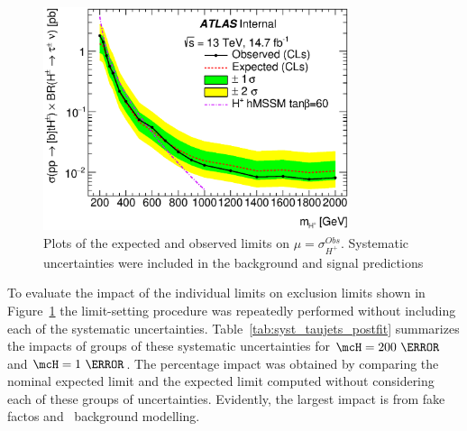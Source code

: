\begin{figure}[!h]
\centering
					 \includegraphics[width=0.8\textwidth]{figures/final_limits_sys_asym_limit_log.eps}
\caption{Plots of the expected and observed limits on $\mu=\sigma^{Obs}_{H^+}$. Systematic uncertainties were included  
in the background and signal predictions}
\label{fig:exclLimB}
\end{figure}

\par To evaluate the impact of the individual limits on exclusion limits shown in Figure~\ref{fig:exclLimB} 
the limit-setting procedure was repeatedly performed without including each of the systematic 
uncertainties. Table~\ref{tab:syst_taujets_postfit} summarizes the impacts of groups of these 
systematic uncertainties for $\mcH=200~\GeV$ and $\mcH=1~\TeV$. The percentage impact was obtained 
by comparing the nominal expected limit and the expected limit computed without considering each of 
these groups of uncertainties. Evidently, the largest impact is from fake factos and \ttbar\ background 
modelling.    

